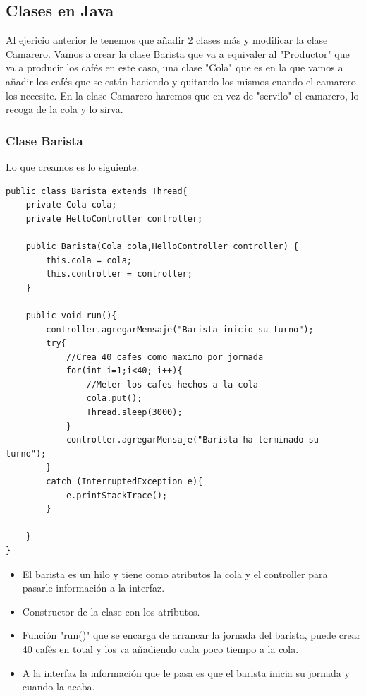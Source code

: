 \documentclass[a4paper,12pt]{article}
\begin{document}
\subsection{Clases en Java}
Al ejericio anterior le tenemos que añadir 2 clases más y modificar la clase Camarero. Vamos a crear la clase Barista que va a equivaler al "Productor" que va a producir los cafés en este caso, una clase "Cola" que es en la que vamos a añadir los cafés que se están haciendo y quitando los mismos cuando el camarero los necesite. En la clase Camarero haremos que en vez de "servilo" el camarero, lo recoga de la cola y lo sirva.

\subsubsection{Clase Barista}
Lo que creamos es lo siguiente: 

\begin{lstlisting}[style=javascript]
public class Barista extends Thread{
    private Cola cola;
    private HelloController controller;

    public Barista(Cola cola,HelloController controller) {
        this.cola = cola;
        this.controller = controller;
    }

    public void run(){
        controller.agregarMensaje("Barista inicio su turno");
        try{
            //Crea 40 cafes como maximo por jornada
            for(int i=1;i<40; i++){
                //Meter los cafes hechos a la cola
                cola.put();
                Thread.sleep(3000);
            }
            controller.agregarMensaje("Barista ha terminado su turno");
        }
        catch (InterruptedException e){
            e.printStackTrace();
        }

    }
}
\end{lstlisting}

\begin{itemize}
    \item El barista es un hilo y tiene como atributos la cola y el controller para pasarle información a la interfaz.
    \item Constructor de la clase con los atributos.
    \item Función "run()" que se encarga de arrancar la jornada del barista, puede crear 40 cafés en total y los va añadiendo cada poco tiempo a la cola.
    \item A la interfaz la información que le pasa es que el barista inicia su jornada y cuando la acaba.
\end{itemize}
\end{document}
